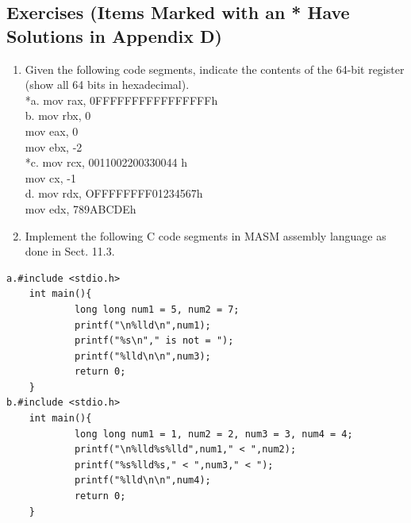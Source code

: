 \documentclass[10pt]{article}
\begin{document}
\subsection*{Exercises (Items Marked with an * Have Solutions in Appendix D)}
\begin{enumerate}
  \item Given the following code segments, indicate the contents of the 64-bit register (show all 64 bits in hexadecimal).\\
*a. mov rax, 0FFFFFFFFFFFFFFFFh\\
b. mov rbx, 0\\
mov eax, 0\\
mov ebx, -2\\
*c. mov rcx, 0011002200330044 h\\
mov cx, -1\\
d. mov rdx, OFFFFFFFF01234567h\\
mov edx, 789ABCDEh
  \item Implement the following C code segments in MASM assembly language as done in Sect. 11.3.
\end{enumerate}

\begin{verbatim}
a.#include <stdio.h>
    int main(){
            long long num1 = 5, num2 = 7;
            printf("\n%lld\n",num1);
            printf("%s\n"," is not = ");
            printf("%lld\n\n",num3);
            return 0;
    }
b.#include <stdio.h>
    int main(){
            long long num1 = 1, num2 = 2, num3 = 3, num4 = 4;
            printf("\n%lld%s%lld",num1," < ",num2);
            printf("%s%lld%s," < ",num3," < ");
            printf("%lld\n\n",num4);
            return 0;
    }
\end{verbatim}
\end{document}
